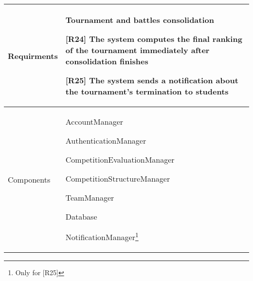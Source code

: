   \begin{table}[!h]
        \centering
        \begin{tabular}{ | m{6em} | m{30em} |} 
            \hline
             Requirments& \textbf{Tournament and battles consolidation}
             
    [R24] The system computes the final ranking of the tournament immediately after consolidation finishes
    
    [R25] The system  sends a notification about the tournament's termination to students 
    \\
            \hline
             Components& 
             AccountManager

             AuthenticationManager

             CompetitionEvaluationManager
                          
             CompetitionStructureManager
             
             TeamManager
             
             Database
             
             NotificationManager\footnote{Only for [R25]}\\
             \hline
        \end{tabular}
        \label{tab:my_label}
    \end{table}
   